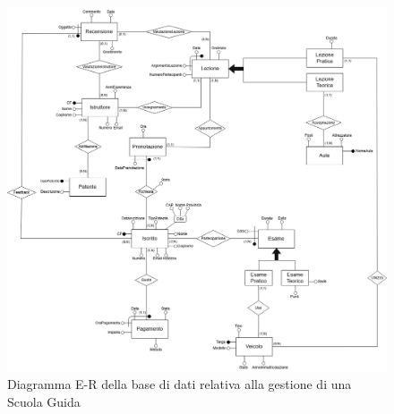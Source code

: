\documentclass[10pt,twoside]{article}
\begin{document}
\begin{figure}[h]        
    \includegraphics[width=.88\linewidth]{img/ER_ScuolaGuida.drawio.png}\centering
    \caption{Diagramma E-R della base di dati relativa alla gestione di una Scuola Guida}
    \label{fig:diagrammaER}
\end{figure}

\newpage
\end{document}
